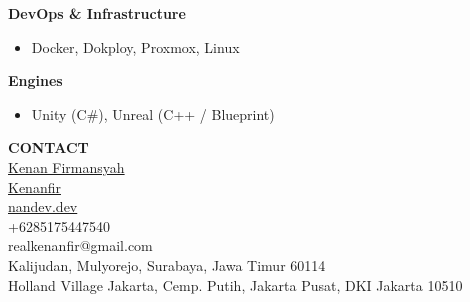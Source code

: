 \documentclass[11pt,a4paper]{article}
\newcommand{\sidesection}[1]{%
    {\large\bfseries\MakeUppercase{#1}}\\[6pt]%
}
\begin{document}
\begin{minipage}[t]{6cm}
\begin{minipage}[t]{5.5cm}
{\small\textbf{DevOps \& Infrastructure}}
\begin{itemize}[leftmargin=*, nosep, itemsep=2pt]
    \item Docker, Dokploy, Proxmox, Linux
\end{itemize}

\vspace{0.2cm}

{\small\textbf{Engines}}
\begin{itemize}[leftmargin=*, nosep, itemsep=2pt]
    \item Unity (C\#), Unreal (C++ / Blueprint)
\end{itemize}

\vspace{0.8cm}

\sidesection{Contact}

 \href{https://linkedin.com/in/kenanfirmansyah}{Kenan Firmansyah}\\[6pt]
 \href{https://github.com/Kenanfir}{Kenanfir}\\[6pt]
 \href{https://nandev.dev}{nandev.dev}\\[6pt]
 +6285175447540\\[6pt]
 realkenanfir@gmail.com\\[10pt]

{\small\color{lighttext}Kalijudan, Mulyorejo, Surabaya, Jawa Timur 60114}\\[6pt]

{\small\color{lighttext}Holland Village Jakarta, Cemp. Putih, Jakarta Pusat, DKI Jakarta 10510}

\end{minipage}
\end{minipage}%
%
\end{document}
